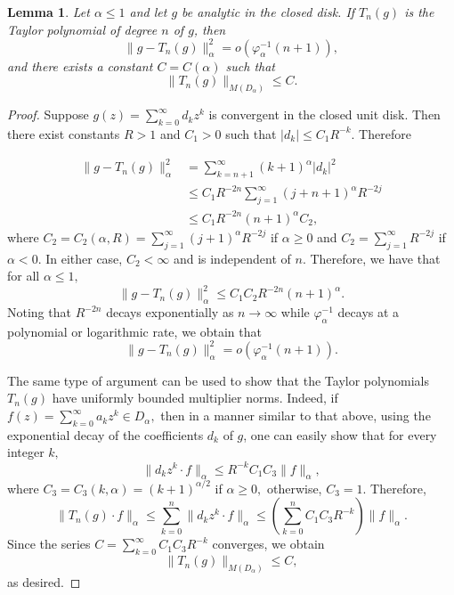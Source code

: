 \documentclass[11 pt,reqno]{amsart}
\newtheorem{lem}[thm]{Lemma}
\theoremstyle{definition}
\theoremstyle{remark}
\numberwithin{equation}{section} \numberwithin{figure}{section}
\begin{document}
\begin{lem}\label{estimates_analytic_continuable}
Let $\alpha\leq 1$ and let $g$ be analytic in the closed disk. If $T_n(g)$
 is the Taylor polynomial of degree $n$ of $g$, then
\[\| g-T_n(g)\|^2_\alpha = o\left( \varphi_{\alpha}^{-1}(n+1)\right), \]
and there exists a constant $C= C(\alpha)$ such that
\[\|T_n(g)\|_{M(D_{\alpha})} \leq C. \]
\end{lem}

\begin{proof}
Suppose $g(z) = \sum_{k=0}^{\infty} d_k z^k$ is convergent in the closed unit disk.
Then there exist constants $R> 1$ and $C_1>0$ such that $|d_k| \leq C_1 R^{-k}$.
Therefore

\begin{align*}
\| g-T_n(g)\|^2_\alpha &= \sum_{k = n+1}^{\infty} (k+1)^{\alpha} |d_k|^2\\
&\leq C_1 R^{-2n} \sum_{j = 1}^{\infty} (j+n+1)^{\alpha} R^{-2j}\\
&\leq C_1 R^{-2n} (n+1)^{\alpha} C_2,
\end{align*}
where $C_2=C_2(\alpha, R) = \sum_{j = 1}^{\infty} (j+1)^{\alpha} R^{-2j} $ if
$\alpha \geq 0$ and $C_2 = \sum_{j = 1}^{\infty} R^{-2j} $ if $\alpha < 0$.  In either
case, $C_2 < \infty$ and is independent of $n$.  Therefore, we have that for all $\alpha\leq 1,$
$$ \| g-T_n(g)\|^2_\alpha \leq C_1 C_2 R^{-2n} (n+1)^{\alpha}.$$ Noting that $R^{-2n}$ decays exponentially as $n \rightarrow \infty$ while $\varphi^{-1}_{\alpha}$ decays at a polynomial or logarithmic rate, we obtain that
\[\| g-T_n(g)\|^2_\alpha = o\left( \varphi_{\alpha}^{-1}(n+1)\right). \]

The same type of argument can be used to show that the Taylor polynomials $T_n(g)$
have uniformly bounded multiplier norms. Indeed, if
$f(z) = \sum_{k=0}^{\infty} a_k z^k \in D_{\alpha},$ then in a manner similar to
that above, using the exponential decay of the coefficients $d_k$ of $g$, one can
easily show that for every integer $k,$
$$ \| d_k z^k \cdot f \|_{\alpha} \leq R^{-k}C_{1}C_3 \| f\|_{\alpha},$$
where $C_3 = C_3(k,\alpha) = (k+1)^{\alpha/2}$ if $\alpha \geq 0,$ otherwise, $C_3 = 1$.
Therefore,
$$ \| T_n(g) \cdot f \|_{\alpha} \leq\sum_{k=0}^n \| d_k z^k \cdot f \|_{\alpha}
\leq \left(   \sum_{k = 0}^{n} C_{1}C_3  R^{-k} \right) \| f \|_{\alpha}.$$
Since the series $C =  \sum_{k = 0}^{\infty} C_1 C_3  R^{-k}$ converges,
we obtain
$$ \|T_n(g)\|_{M(D_{\alpha})} \leq C, $$ as desired.
\end{proof}
\end{document}
